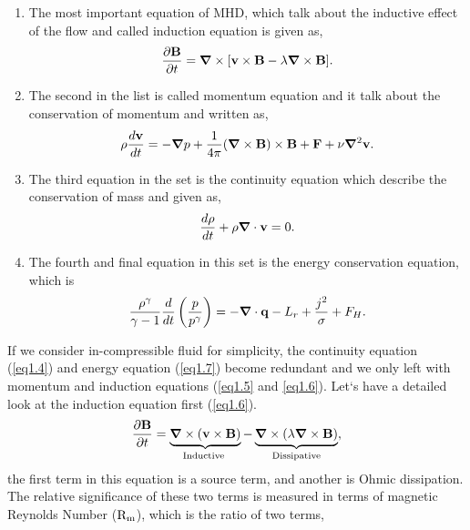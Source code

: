 \begin{enumerate}
    \item The most important equation of MHD, which talk about the inductive effect of the flow and called induction equation is given as,
\begin{equation}
     \frac{\partial\vb{B}}{\partial t}=\bm{\nabla}\times[\vb{v}\times\vb{B}-\lambda\bm{\nabla}\times\vb{B}]. \label{eq1.6}
\end{equation}
    \item The second in the list is called momentum equation and it talk about the conservation of momentum and written as,
\begin{equation}
    \rho\frac{d\vb{v}}{dt}=-\bm{\nabla}p+\frac{1}{4\pi}(\bm{\nabla}\times\vb{B})\times \vb{B}+\vb{F}+\nu\bm{\nabla}^2\vb{v}.   \label{eq1.5}
\end{equation}
    \item The third equation in the set is the continuity equation which describe the conservation of mass and given as,
\begin{equation}
    \frac{d\rho}{dt}+ \rho\bm{\nabla}\cdot\vb{v}=0.
    \label{eq1.4}
\end{equation}
    \item The fourth and final equation in this set is the energy conservation equation, which is
\begin{equation}
     \frac{\rho^\gamma}{\gamma-1}\frac{d}{dt}\left( \frac{p}{p^\gamma}\right)=-\bm{\nabla}\cdot\vb{q}-L_r+\frac{j^2}{\sigma}+F_H.
    \label{eq1.7}
\end{equation}
\end{enumerate}
If we consider in-compressible fluid for simplicity, the continuity equation (\autoref{eq1.4}) and energy equation (\autoref{eq1.7}) become redundant and we only left with momentum and induction equations (\autoref{eq1.5} and \ref{eq1.6}). Let`s have a detailed look at the induction equation first (\autoref{eq1.6}).
\begin{equation}
    \frac{\partial\vb{B}}{\partial t}=\underbrace{\bm{\nabla}\times(\vb{v}\times\vb{B})}_{\text{Inductive }}-\underbrace{\bm{\nabla}\times(\lambda\bm{\nabla}\times\vb{B})}_{\text{Dissipative}}, \label{eq1.8}
\end{equation}
the first term in this equation is a source term, and another is Ohmic dissipation. The relative significance of these two terms is measured in terms of magnetic Reynolds Number (${\rm R_m}$), which is the ratio of two terms,
